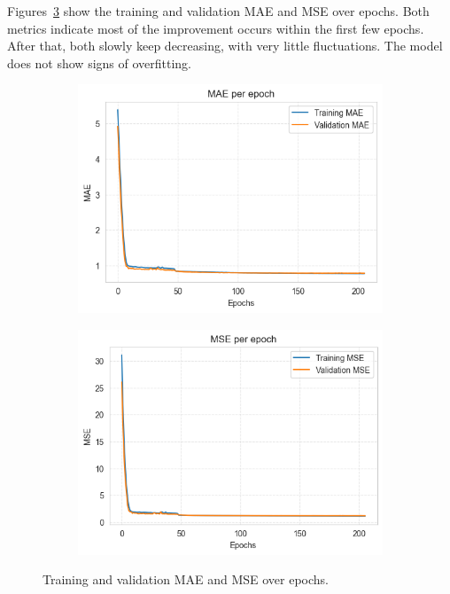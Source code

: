 Figures~\ref{fig:mae_mse_nn} show the training and validation MAE
and MSE over epochs.
Both metrics indicate most of the improvement occurs within
the first few epochs. After that, both slowly keep
decreasing, with very little fluctuations.
The model does not show signs of overfitting.
\begin{figure}[H]
    \centering
    \begin{subfigure}{0.49\textwidth}
        \centering
        \includegraphics[width=\textwidth]{plotsss/mae_nn.png}
        \label{fig:mae_nn}
    \end{subfigure}
    \hfill
    \begin{subfigure}{0.49\textwidth}
        \centering
        \includegraphics[width=\textwidth]{plotsss/mse_nn.png}
        \label{fig:mse_nn}
    \end{subfigure}
    \caption{Training and validation MAE and MSE over epochs.}
    \label{fig:mae_mse_nn}
\end{figure}

